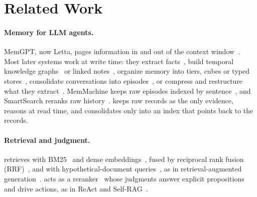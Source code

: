\section{Related Work}
\label{sec:related}

\paragraph{Memory for LLM agents.}
MemGPT, now Letta, pages information in and out of the context window~\citep{packer2023memgpt,letta2024}.
Most later systems work at write time: they extract facts~\citep{chhikara2025mem0}, build temporal knowledge graphs~\citep{rasmussen2025zep} or linked notes~\citep{xu2025amem}, organize memory into tiers, cubes or typed stores~\citep{kang2025memoryos,li2025memos,wang2025mirix}, consolidate conversations into episodes~\citep{evermemos2026,nan2025nemori}, or compress and restructure what they extract~\citep{fang2025lightmem,simplemem2026,premem2025,hmem2026,hymem2026,leanmem2026,lychee2026,emem2025,swiftmem2026,memori2026,hindsight2025}.
MemMachine keeps raw episodes indexed by sentence~\citep{memmachine2026}, and SmartSearch reranks raw history~\citep{smartsearch2026}.
\sys{} keeps raw records as the only evidence, reasons at read time, and consolidates only into an index that points back to the records.

\paragraph{Retrieval and judgment.}
\sys{} retrieves with BM25~\citep{robertson2009bm25} and dense embeddings~\citep{nussbaum2024nomic}, fused by reciprocal rank fusion (RRF)~\citep{cormack2009rrf}, and with hypothetical-document queries~\citep{gao2023hyde}, as in retrieval-augmented generation~\citep{lewis2020rag}.
\jev{} acts as a reranker~\citep{nogueira2019passage,sun2023rankgpt} whose judgments answer explicit propositions and drive actions, as in ReAct and Self-RAG~\citep{yao2023react,asai2024selfrag}.

